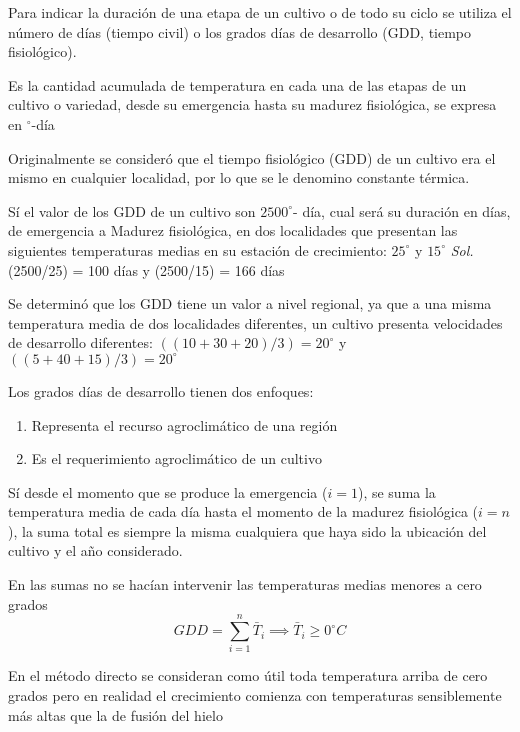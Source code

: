 \begin{definition}
    Para indicar la duración de una etapa de un cultivo o de todo su ciclo se utiliza el número de días (tiempo civil) o los grados días de desarrollo (GDD, tiempo fisiológico).

    Es la cantidad acumulada de temperatura en cada una de las etapas de un cultivo o variedad, desde su emergencia hasta su madurez fisiológica, se expresa en $^{\circ}$-día

    Originalmente se consideró que el tiempo fisiológico (GDD) de un cultivo era el mismo en cualquier localidad, por lo que se le denomino constante térmica.
\end{definition}
\begin{example}
    Sí el valor de los GDD de un cultivo son $2500^{\circ}$- día, cual será su duración en días, de
emergencia a Madurez fisiológica, en dos
localidades que presentan las siguientes
temperaturas medias en su estación de
crecimiento: $25^{\circ}$ y $15^{\circ}$
\textit{ Sol. }
    (2500/25) = 100 días y (2500/15) = 166 días
\end{example}

Se determinó que los GDD tiene un valor a nivel regional, ya que a una misma temperatura media de dos localidades diferentes, un cultivo presenta velocidades de desarrollo diferentes: $((10+30+20)/3) = 20^{\circ}$ y $((5+40+15)/3) = 20^{\circ}$

Los grados días de desarrollo tienen dos
enfoques:
\begin{enumerate}
    \item Representa el recurso agroclimático de una región
    \item Es el requerimiento agroclimático de un cultivo
\end{enumerate}

Sí desde el momento que se produce la emergencia ($i = 1$), se suma la temperatura media de cada día hasta el momento de la madurez fisiológica ($i = n$), la suma total es siempre la misma cualquiera que haya sido la ubicación del cultivo y el año considerado.

En las sumas no se hacían intervenir las temperaturas medias menores a cero grados
\begin{equation}
    GDD= \sum_{i=1}^n \bar{T}_i\implies \bar{T}_i\geq 0^{\circ}C
\end{equation}

En el método directo se consideran como útil toda temperatura arriba de cero grados pero en realidad el crecimiento comienza con temperaturas sensiblemente más altas que la de fusión del hielo

